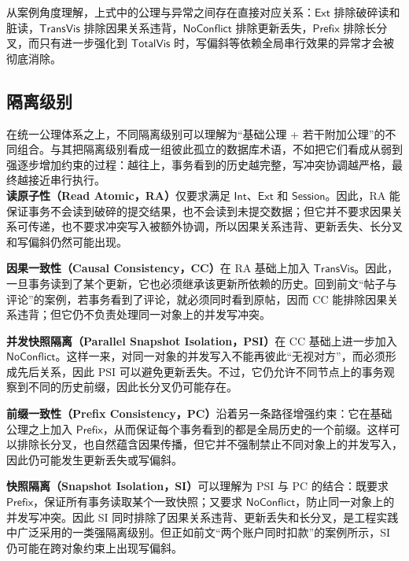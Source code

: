 从案例角度理解，上式中的公理与异常之间存在直接对应关系：$\mathsf{Ext}$ 排除破碎读和脏读，$\mathsf{TransVis}$ 排除因果关系违背，$\mathsf{NoConflict}$ 排除更新丢失，$\mathsf{Prefix}$ 排除长分叉，而只有进一步强化到 $\mathsf{TotalVis}$ 时，写偏斜等依赖全局串行效果的异常才会被彻底消除。

\subsection{隔离级别}
在统一公理体系之上，不同隔离级别可以理解为“基础公理 + 若干附加公理”的不同组合。与其把隔离级别看成一组彼此孤立的数据库术语，不如把它们看成从弱到强逐步增加约束的过程：越往上，事务看到的历史越完整，写冲突协调越严格，最终越接近串行执行。
\\

\noindent\textbf{读原子性（Read Atomic，RA）}\cite{bailis2016ramp}仅要求满足 $\mathsf{Int}$、$\mathsf{Ext}$ 和 $\mathsf{Session}$。因此，RA 能保证事务不会读到破碎的提交结果，也不会读到未提交数据；但它并不要求因果关系可传递，也不要求冲突写入被额外协调，所以因果关系违背、更新丢失、长分叉和写偏斜仍然可能出现。

\noindent\textbf{因果一致性（Causal Consistency，CC）}\cite{akkoorath2016cure}在 RA 基础上加入 $\mathsf{TransVis}$。因此，一旦事务读到了某个更新，它也必须继承该更新所依赖的历史。回到前文“帖子与评论”的案例，若事务看到了评论，就必须同时看到原帖，因而 CC 能排除因果关系违背；但它仍不负责处理同一对象上的并发写冲突。

\noindent\textbf{并发快照隔离（Parallel Snapshot Isolation，PSI）}\cite{sovran2011walter}在 CC 基础上进一步加入 $\mathsf{NoConflict}$。这样一来，对同一对象的并发写入不能再彼此“无视对方”，而必须形成先后关系，因此 PSI 可以避免更新丢失。不过，它仍允许不同节点上的事务观察到不同的历史前缀，因此长分叉仍可能存在。

\noindent\textbf{前缀一致性（Prefix Consistency，PC）}\cite{burckhardt2015global}沿着另一条路径增强约束：它在基础公理之上加入 $\mathsf{Prefix}$，从而保证每个事务看到的都是全局历史的一个前缀。这样可以排除长分叉，也自然蕴含因果传播，但它并不强制禁止不同对象上的并发写入，因此仍可能发生更新丢失或写偏斜。

\noindent\textbf{快照隔离（Snapshot Isolation，SI）}\cite{berenson1995critique}可以理解为 PSI 与 PC 的结合：既要求 $\mathsf{Prefix}$，保证所有事务读取某个一致快照；又要求 $\mathsf{NoConflict}$，防止同一对象上的并发写冲突。因此 SI 同时排除了因果关系违背、更新丢失和长分叉，是工程实践中广泛采用的一类强隔离级别。但正如前文“两个账户同时扣款”的案例所示，SI 仍可能在跨对象约束上出现写偏斜。

